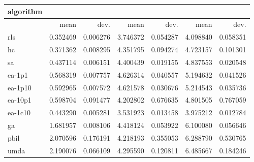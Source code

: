 \begin{tabular}{@{}l*{6}{>{{}}N{1}{2}}@{}}
\toprule
{algorithm} &  &  &  \\
\midrule
& {mean} & {dev.} & {mean} & {dev.} & {mean} & {dev.} \\
\midrule
rls & 0.352469 & 0.006276 & 3.746372 & 0.054287 & 4.098840 & 0.058351 \\
 hc & 0.371362 & 0.008295 & 4.351795 & 0.094274 & 4.723157 & 0.101301 \\
 sa & 0.437114 & 0.006151 & 4.400439 & 0.019155 & 4.837553 & 0.020548 \\
 ea-1p1 & 0.568319 & 0.007757 & 4.626314 & 0.040557 & 5.194632 & 0.041526 \\
 ea-1p10 & 0.592965 & 0.007572 & 4.621578 & 0.030676 & 5.214543 & 0.035736 \\
 ea-10p1 & 0.598704 & 0.091477 & 4.202802 & 0.676635 & 4.801505 & 0.767059 \\
 ea-1c10 & 0.443290 & 0.005281 & 3.531923 & 0.013458 & 3.975212 & 0.012784 \\
 ga & 1.681957 & 0.008106 & 4.418124 & 0.053922 & 6.100080 & 0.056646 \\
 pbil & 2.070596 & 0.176191 & 4.218193 & 0.355053 & 6.288790 & 0.530765 \\
 umda & 2.190076 & 0.066109 & 4.295590 & 0.120811 & 6.485667 & 0.184246 \\
 \bottomrule
\end{tabular}
